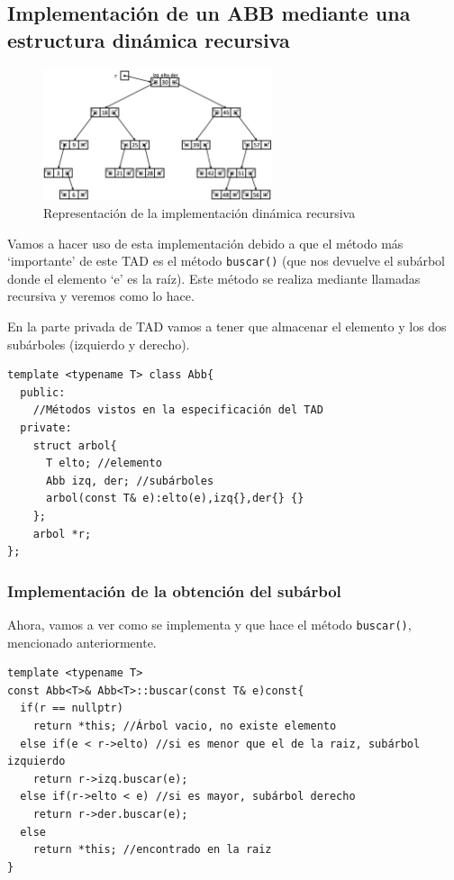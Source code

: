 \subsection{Implementación de un ABB mediante una estructura dinámica recursiva}
\begin{figure}[h]
  \begin{center}
    \includegraphics[width=0.6\textwidth]{assets/abb4.png}
  \end{center}
  \caption{Representación de la implementación dinámica recursiva}
\end{figure}

Vamos a hacer uso de esta implementación debido a que el método más `importante' de este TAD es el método \texttt{buscar()} (que nos devuelve el subárbol donde el elemento `e' es la raíz). Este método se realiza mediante llamadas recursiva y veremos como lo hace.

En la parte privada de TAD vamos a tener que almacenar el elemento y los dos subárboles (izquierdo y derecho).
\begin{verbatim}
template <typename T> class Abb{
  public:
    //Métodos vistos en la especificación del TAD
  private:
    struct arbol{
      T elto; //elemento
      Abb izq, der; //subárboles
      arbol(const T& e):elto(e),izq{},der{} {}
    };
    arbol *r;
};
\end{verbatim}
\subsubsection*{Implementación de la obtención del subárbol}
Ahora, vamos a ver como se implementa y que hace el método \texttt{buscar()}, mencionado anteriormente.
\begin{verbatim}
template <typename T>
const Abb<T>& Abb<T>::buscar(const T& e)const{
  if(r == nullptr)
    return *this; //Árbol vacio, no existe elemento
  else if(e < r->elto) //si es menor que el de la raiz, subárbol izquierdo
    return r->izq.buscar(e);
  else if(r->elto < e) //si es mayor, subárbol derecho
    return r->der.buscar(e);
  else 
    return *this; //encontrado en la raiz
}
\end{verbatim}

